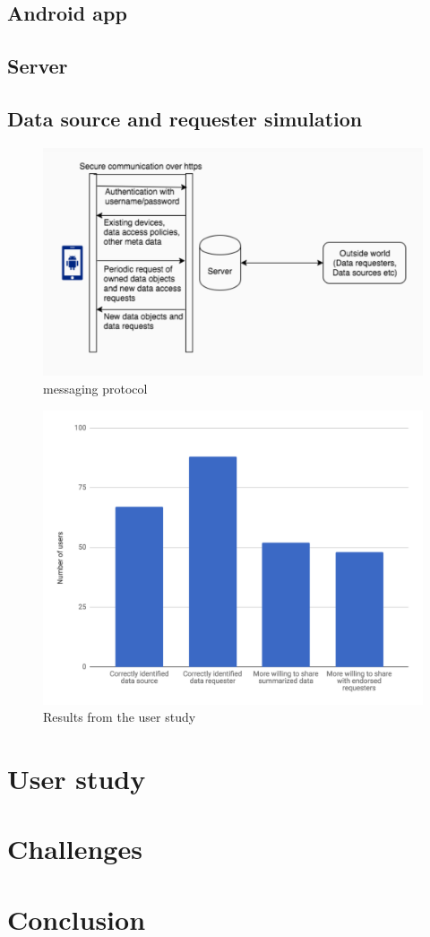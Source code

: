 \documentclass[conference]{IEEEtran}
\begin{document}
\subsection{Android app}

\subsection{Server}

\subsection{Data source and requester simulation}
\begin{figure}[t]
	\includegraphics[width=0.95\linewidth]{app_server.png}
	\caption{messaging protocol}
	\label{fig:mes_protocol}
\end{figure}


\begin{figure}[t]
	\includegraphics[width=0.95\linewidth]{user_study.png}
	\caption{Results from the user study}
	\label{fig:user_study}
\end{figure}
\section{User study}


\section{Challenges}


\section{Conclusion}


\begin{thebibliography}{00}

\end{thebibliography}
\end{document}
